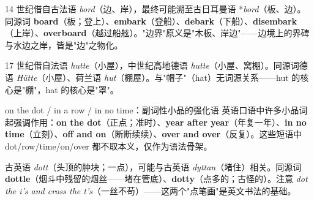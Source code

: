 \documentclass[../main.tex]{subfiles}
\begin{document}
\begin{origin}
14 世纪借自古法语 \textit{bord}（边、岸），最终可能溯至古日耳曼语 *\textit{bord}（板、边）。同源词 \textbf{board}（板；登上）、\textbf{embark}（登船）、\textbf{debark}（下船）、\textbf{disembark}（上岸）、\textbf{overboard}（越过船舷）。"边界"原义是"木板、岸边"——边境上的界碑与水边之岸，皆是"边"之物化。
\end{origin}



\begin{origin}
17 世纪借自法语 \textit{hutte}（小屋），中世纪高地德语 \textit{hutte}（小屋、窝棚）。同源词德语 \textit{Hütte}（小屋）、荷兰语 \textit{hut}（棚屋）。与"帽子"（hat）无词源关系——hut 的核心是"棚"，hat 的核心是"罩"。
\end{origin}





\begin{gram}{on the dot / in a row / in no time：副词性小品的强化语}
英语口语中许多小品词起强调作用：\textbf{on the dot}（正点；准时）、\textbf{year after year}（年复一年）、\textbf{in no time}（立刻）、\textbf{off and on}（断断续续）、\textbf{over and over}（反复）。这些短语中 dot/row/time/on/over 都不取本义，仅作为语法骨架。
\end{gram}

\begin{origin}
古英语 \textit{dott}（头顶的肿块；一点），可能与古英语 \textit{dyttan}（堵住）相关。同源词 \textbf{dottle}（烟斗中残留的烟丝——堵在管底）、\textbf{dotty}（点多的；古怪的）。注意 \textit{dot the i's and cross the t's}（一丝不苟）——这两个"点笔画"是英文书法的基础。
\end{origin}
\end{document}
